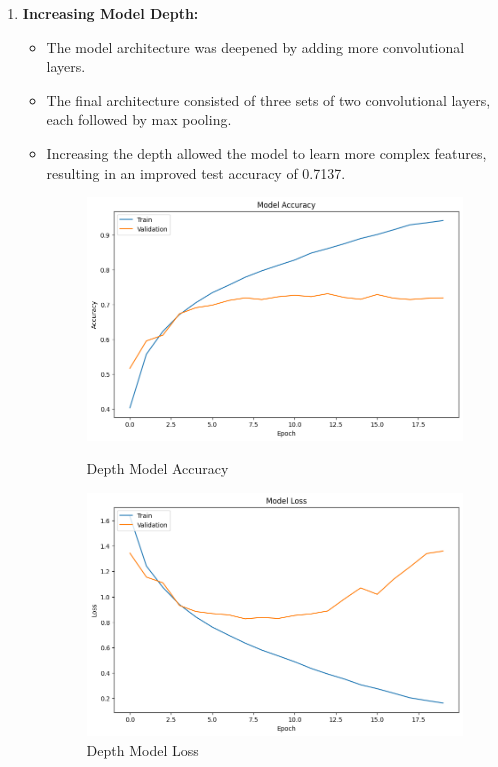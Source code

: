 \documentclass{article}
\begin{document}
\begin{enumerate}
\begin{itemize}
    \end{itemize}
    
    \item \textbf{Increasing Model Depth:}
    \begin{itemize}
        \item The model architecture was deepened by adding more convolutional layers.
        \item The final architecture consisted of three sets of two convolutional layers, each followed by max pooling.
        \item Increasing the depth allowed the model to learn more complex features, resulting in an improved test accuracy of 0.7137.

        \begin{figure}[H]
        \centering
        \begin{minipage}{0.45\textwidth}
            \centering
            \includegraphics[width=\textwidth]{DepthMA.png}
            \caption{Depth  Model Accuracy}
            \label{DMA}
        \end{minipage}
        \hfill
        \begin{minipage}{0.45\textwidth}
            \centering
            \includegraphics[width=\textwidth]{DepthML.png}
            \caption{Depth Model Loss}
            \label{DML}
        \end{minipage}
    \end{figure}
        

\end{itemize}
\end{enumerate}
\end{document}
